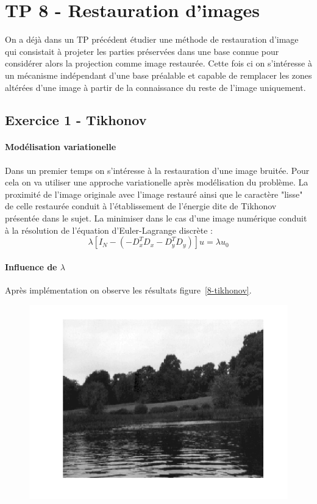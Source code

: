 \documentclass{article}
\begin{document}
\section{TP 8 - Restauration d'images}
On a déjà dans un TP précédent étudier une méthode de restauration d'image qui consistait à projeter les parties préservées dans une base connue pour considérer alors la projection comme image restaurée. Cette fois ci on s'intéresse à un mécanisme indépendant d'une base préalable et capable de remplacer les zones altérées d'une image à partir de la connaissance du reste de l'image uniquement.

\subsection{Exercice 1 - Tikhonov}
\paragraph{Modélisation variationelle}
Dans un premier temps on s'intéresse à la restauration d'une image bruitée. Pour cela on va utiliser une approche variationelle après modélisation du problème. La proximité de l'image originale avec l'image restauré ainsi que le caractère "lisse" de celle restaurée conduit à l'établissement de l'énergie dite de Tikhonov présentée dans le sujet. La minimiser dans le cas d'une image numérique conduit à la résolution de l'équation d'Euler-Lagrange discrète :
\[\lambda [I_N - (-D_x^TD_x - D_y^TD_y)]u = \lambda u_0\]

\paragraph{Influence de $\lambda$}
Après implémentation on observe les résultats figure~\ref{8-tikhonov}.

\begin{figure}[!ht]
\includegraphics[width=\textwidth]{images/1/1-1-autumn_b.png}
\end{figure}
\end{document}
